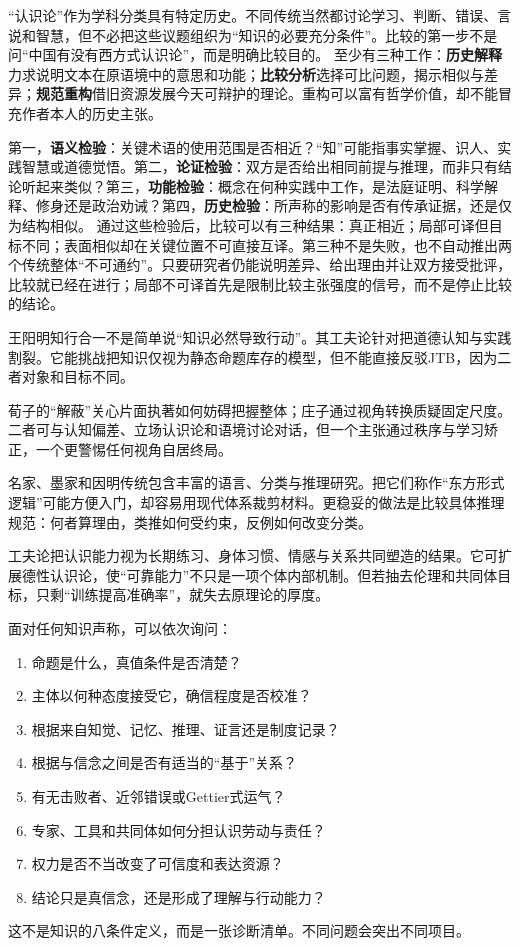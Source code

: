 “认识论”作为学科分类具有特定历史。不同传统当然都讨论学习、判断、错误、言说和智慧，但不必把这些议题组织为“知识的必要充分条件”。比较的第一步不是问“中国有没有西方式认识论”，而是明确比较目的。 至少有三种工作：\textbf{历史解释}力求说明文本在原语境中的意思和功能；\textbf{比较分析}选择可比问题，揭示相似与差异；\textbf{规范重构}借旧资源发展今天可辩护的理论。重构可以富有哲学价值，却不能冒充作者本人的历史主张。

第一，\textbf{语义检验}：关键术语的使用范围是否相近？“知”可能指事实掌握、识人、实践智慧或道德觉悟。第二，\textbf{论证检验}：双方是否给出相同前提与推理，而非只有结论听起来类似？第三，\textbf{功能检验}：概念在何种实践中工作，是法庭证明、科学解释、修身还是政治劝诫？第四，\textbf{历史检验}：所声称的影响是否有传承证据，还是仅为结构相似。 通过这些检验后，比较可以有三种结果：真正相近；局部可译但目标不同；表面相似却在关键位置不可直接互译。第三种不是失败，也不自动推出两个传统整体“不可通约”。只要研究者仍能说明差异、给出理由并让双方接受批评，比较就已经在进行；局部不可译首先是限制比较主张强度的信号，而不是停止比较的结论。

王阳明知行合一不是简单说“知识必然导致行动”。其工夫论针对把道德认知与实践割裂\parencite{tiwald2014}。它能挑战把知识仅视为静态命题库存的模型，但不能直接反驳JTB，因为二者对象和目标不同。

荀子的“解蔽”关心片面执著如何妨碍把握整体\parencite{xunzi2014}；庄子通过视角转换质疑固定尺度\parencite{zhuangzi2009}。二者可与认知偏差、立场认识论和语境讨论对话，但一个主张通过秩序与学习矫正，一个更警惕任何视角自居终局。

名家、墨家和因明传统包含丰富的语言、分类与推理研究\parencite{graham1989,dunne2004}。把它们称作“东方形式逻辑”可能方便入门，却容易用现代体系裁剪材料。更稳妥的做法是比较具体推理规范：何者算理由，类推如何受约束，反例如何改变分类。

工夫论把认识能力视为长期练习、身体习惯、情感与关系共同塑造的结果。它可扩展德性认识论，使“可靠能力”不只是一项个体内部机制。但若抽去伦理和共同体目标，只剩“训练提高准确率”，就失去原理论的厚度。

面对任何知识声称，可以依次询问：
\begin{enumerate}
  \item 命题是什么，真值条件是否清楚？
  \item 主体以何种态度接受它，确信程度是否校准？
  \item 根据来自知觉、记忆、推理、证言还是制度记录？
  \item 根据与信念之间是否有适当的“基于”关系？
  \item 有无击败者、近邻错误或Gettier式运气？
  \item 专家、工具和共同体如何分担认识劳动与责任？
  \item 权力是否不当改变了可信度和表达资源？
  \item 结论只是真信念，还是形成了理解与行动能力？
\end{enumerate}
这不是知识的八条件定义，而是一张诊断清单。不同问题会突出不同项目。

